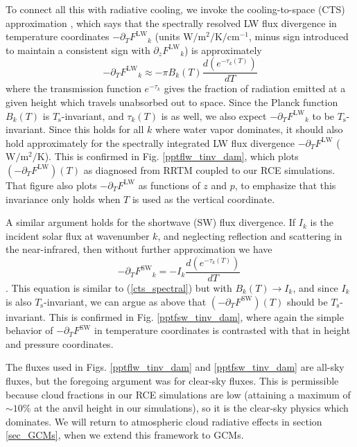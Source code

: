 \documentclass[10pt]{article}
\newcommand{\beqn}{\begin{equation}}
\newcommand{\eeqn}{\end{equation}}
\newcommand{\eqnref}[1]{(\ref{#1})}
\newcommand{\der}[2]{\ensuremath{\frac{d #1}{d #2}}}
\newcommand{\ppz}{\ensuremath{\partial_z}}
\newcommand{\ppt}{\ensuremath{\partial_T}}
\newcommand{\FLW}{\ensuremath{F^\mathrm{LW}}}
\newcommand{\FSW}{\ensuremath{F^\mathrm{SW}}}
\newcommand{\cminverse}{\ensuremath{\mathrm{cm^{-1}}}}
\newcommand{\tauk}{\ensuremath{\tau_k}}
\newcommand{\Wmsq}{\ensuremath{\mathrm{W/m^2}}}
\newcommand{\Ts}{\ensuremath{T_\mathrm{s}}}
\begin{document}
	To connect all this with radiative cooling, we invoke the cooling-to-space (CTS) approximation \citep[e.g.,][]{thomas2002}, which says that the spectrally resolved LW flux divergence in temperature coordinates $-\ppt \FLW_k$ (units $\Wmsq/\mathrm{K}/\cminverse$, minus sign introduced to maintain a consistent sign with  $\ppz \FLW_k$) is approximately
	\beqn
		-\ppt \FLW_k \approx - \pi B_k(T) \frac{d (e^{-\tauk(T)})}{dT}
	\label{cts_spectral}
	\eeqn
where  the transmission function $e^{-\tauk}$ gives the fraction of radiation emitted at a given height which travels unabsorbed out to space. Since the Planck function $B_k(T)$ is \Ts-invariant, and $\tauk(T)$ is as well, we also expect $-\ppt \FLW_k$ to be \Ts-invariant. Since this holds for all $k$ where water vapor dominates, it should also hold approximately for the spectrally integrated LW flux divergence $-\ppt \FLW$ ($\Wmsq/\mathrm{K}$). This is confirmed in  Fig.  \ref{pptflw_tinv_dam}, which plots $(-\ppt \FLW)(T)$ as diagnosed from RRTM coupled to our  RCE simulations.  That figure also plots $-\ppt \FLW$ as functions of $z$ and $p$, to emphasize that this invariance only holds  when $T$ is used as the vertical coordinate.
	
	A similar argument holds for the shortwave (SW) flux divergence. If $I_k$ is the incident solar flux at wavenumber $k$, and  neglecting reflection and scattering in the  near-infrared, 
then without further approximation we have
	\beqn
		-\ppt \FSW_k = - I_k \der{(e^{-\tauk(T)})}{T}
		\
	\eeqn
\citep[c.f.][eqn. 9.26]{thomas2002}. This equation is similar to  \eqnref{cts_spectral} but with $B_k(T) \rightarrow I_k$, and since $I_k$ is also \Ts-invariant, we can argue as above that $(-\ppt \FSW)(T)$ should be \Ts-invariant. This is confirmed in Fig. \ref{pptfsw_tinv_dam}, where again the simple behavior of $-\ppt \FSW$ in temperature coordinates is contrasted with that in height and pressure coordinates.

The fluxes used in Figs.  \ref{pptflw_tinv_dam} and \ref{pptfsw_tinv_dam} are all-sky fluxes, but the foregoing argument was for clear-sky fluxes. This is permissible because cloud fractions in our RCE simulations are low (attaining a maximum of $\sim 10 \%$ at the anvil height in our simulations), so it is the clear-sky physics which dominates. We will return to atmospheric cloud radiative effects in section \ref{sec_GCMs}, when we extend this framework to GCMs.
 
		
\end{document}
